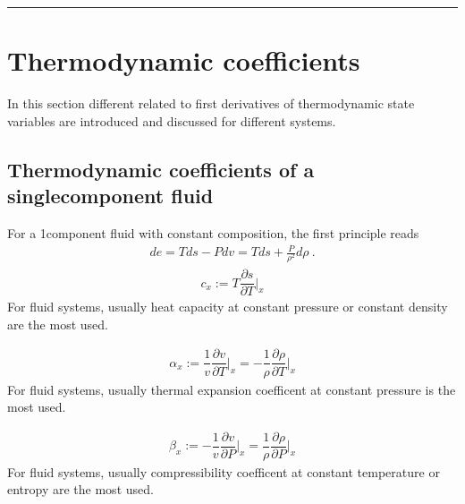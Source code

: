 \documentclass[letterpaper,10pt,english]{jupyterBook}
\begin{document}
\bigskip\hrule\bigskip


\sphinxstepscope




\chapter{Thermodynamic coefficients}
\label{\detokenize{ch/coefficients:thermodynamic-coefficients}}\label{\detokenize{ch/coefficients:classical-thermodynamics-coefficients}}\label{\detokenize{ch/coefficients::doc}}
\sphinxAtStartPar
In this section different related to first derivatives of thermodynamic state variables are introduced and discussed for different systems.


\section{Thermodynamic coefficients of a single\sphinxhyphen{}component fluid}
\label{\detokenize{ch/coefficients:thermodynamic-coefficients-of-a-single-component-fluid}}
\sphinxAtStartPar
For a 1\sphinxhyphen{}component fluid with constant composition, the first principle reads
\begin{equation*}
\begin{split}de = T ds - P dv = T ds + \frac{P}{\rho^2} d \rho \ .\end{split}
\end{equation*}
\sphinxAtStartPar
{}
\begin{equation*}
\begin{split}c_x := T \dfrac{\partial s}{\partial T}\Big|_x\end{split}
\end{equation*}
\sphinxAtStartPar
For fluid systems, usually heat capacity at constant pressure or constant density are the most used.

\sphinxAtStartPar
{}
\begin{equation*}
\begin{split}\alpha_x := \dfrac{1}{v} \dfrac{\partial v}{\partial T}\Big|_x = - \dfrac{1}{\rho} \dfrac{\partial \rho}{\partial T}\Big|_x\end{split}
\end{equation*}
\sphinxAtStartPar
For fluid systems, usually thermal expansion coefficent at constant pressure is the most used.

\sphinxAtStartPar
{}
\begin{equation*}
\begin{split}\beta_x := - \dfrac{1}{v} \dfrac{\partial v}{\partial P}\Big|_x = \dfrac{1}{\rho} \dfrac{\partial \rho}{\partial P}\Big|_x\end{split}
\end{equation*}
\sphinxAtStartPar
For fluid systems, usually compressibility coefficent at constant temperature or entropy are the most used.
\end{document}
